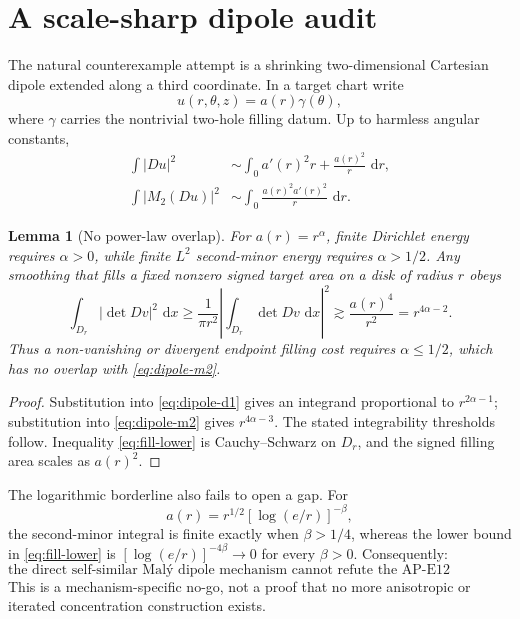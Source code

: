 \documentclass[11pt]{article}
\newtheorem{lemma}[theorem]{Lemma}
\newcommand{\dd}{\,\mathrm d}
\begin{document}
\section{A scale-sharp dipole audit}

The natural counterexample attempt is a shrinking two-dimensional
Cartesian dipole extended along a third coordinate.  In a target chart write
\begin{equation}
 u(r,\theta,z)=a(r)\gamma(\theta),
 \label{eq:dipole}
\end{equation}
where $\gamma$ carries the nontrivial two-hole filling datum.  Up to harmless
angular constants,
\begin{align}
 \int |Du|^2&\sim\int_0 a'(r)^2r+\frac{a(r)^2}{r}\,\dd r,
 \label{eq:dipole-d1}\\
 \int |M_2(Du)|^2&\sim\int_0\frac{a(r)^2a'(r)^2}{r}\,\dd r.
 \label{eq:dipole-m2}
\end{align}

\begin{lemma}[No power-law overlap]
For $a(r)=r^\alpha$, finite Dirichlet energy requires $\alpha>0$, while
finite $L^2$ second-minor energy requires $\alpha>1/2$.  Any smoothing that
fills a fixed nonzero signed target area on a disk of radius $r$ obeys
\begin{equation}
 \int_{D_r}|\det Dv|^2\,\dd x
 \geq\frac1{\pi r^2}\left|\int_{D_r}\det Dv\,\dd x\right|^2
 \gtrsim\frac{a(r)^4}{r^2}=r^{4\alpha-2}.
 \label{eq:fill-lower}
\end{equation}
Thus a non-vanishing or divergent endpoint filling cost requires
$\alpha\leq1/2$, which has no overlap with \eqref{eq:dipole-m2}.
\end{lemma}

\begin{proof}
Substitution into \eqref{eq:dipole-d1} gives an integrand proportional to
$r^{2\alpha-1}$; substitution into \eqref{eq:dipole-m2} gives
$r^{4\alpha-3}$.  The stated integrability thresholds follow.  Inequality
\eqref{eq:fill-lower} is Cauchy--Schwarz on $D_r$, and the signed filling area
scales as $a(r)^2$.
\end{proof}

The logarithmic borderline also fails to open a gap.  For
\begin{equation}
 a(r)=r^{1/2}[\log(e/r)]^{-\beta},
\end{equation}
the second-minor integral is finite exactly when $\beta>1/4$, whereas the
lower bound in \eqref{eq:fill-lower} is
$[\log(e/r)]^{-4\beta}\to0$ for every $\beta>0$.  Consequently:
\begin{equation}
 \boxed{\text{the direct self-similar Mal\'y dipole mechanism cannot refute
 the AP-E12 endpoint.}}
 \label{eq:dipole-no-go}
\end{equation}
This is a mechanism-specific no-go, not a proof that no more anisotropic or
iterated concentration construction exists.
\end{document}
